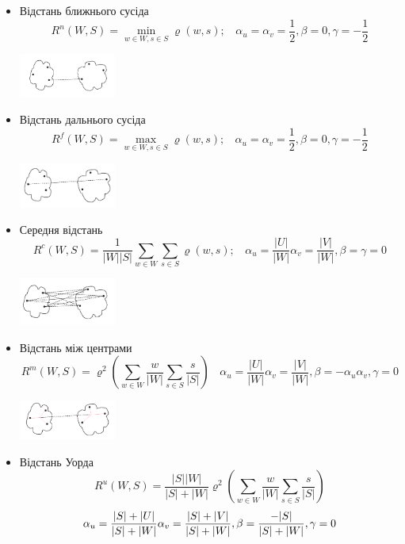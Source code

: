 \documentclass[a4paper,14pt,russian]{extreport}
\begin{document}
   	\begin{itemize}
   	\item Відстань ближнього сусіда  	\[ R^{n}(W,S) = \min_{w \in W, s \in S} \varrho(w,s); \ \ \ \ \alpha_{u} = \alpha_{v} = \dfrac{1}{2}, \beta = 0, \gamma = - \dfrac{1}{2}\] 

    \includegraphics[width=0.25\textwidth]{9}

   	
   		\item Відстань дальнього сусіда  	\[ R^{f}(W,S) = \max_{w \in W, s \in S} \varrho(w,s); \ \ \ \ \alpha_{u} = \alpha_{v} = \dfrac{1}{2}, \beta = 0, \gamma = - \dfrac{1}{2}\] 
   	
    \includegraphics[width=0.25\textwidth]{10}

   		
   		   \item Середня відстань  	\[ R^{c}(W,S) = \dfrac{1}{|W||S|} \sum_{w \in W} \sum_{s \in S} \varrho(w,s); \ \ \ \ \alpha_{u} = \dfrac{|U|}{|W|} \alpha_{v} = \dfrac{|V|}{|W|}, \beta = \gamma = 0\] 
   		   


    \includegraphics[width=0.25\textwidth]{11}

   		   \item Відстань між центрами 
   		   		\[ R^{m}(W,S) = \varrho^{2} ( \sum_{w \in W} \dfrac{w}{|W|} \sum_{s \in S} \dfrac{s}{|S|} )\ \ \ \ \alpha_{u} = \dfrac{|U|}{|W|} \alpha_{v} = \dfrac{|V|}{|W|}, \beta = - \alpha_{u} \alpha_{v}, \gamma = 0\] 

   		\includegraphics[width=0.25\textwidth]{12}
   		
    
   		   		
   		   		  \item Відстань Уорда 
   		   		\[ R^{u}(W,S) = \dfrac{|S||W|}{|S|+|W|} \varrho^{2} ( \sum_{w \in W} \dfrac{w}{|W|} \sum_{s \in S} \dfrac{s}{|S|} ) \] \[\alpha_{u} = \dfrac{|S|+|U|}{|S| + |W|} \alpha_{v} = \dfrac{|S|+|V|}{|S|+|W|}, \\ \beta = \dfrac{-|S|}{|S|+|W|}, \gamma = 0\] 
   		   		
   		   		

   	\end{itemize}
\end{document}
